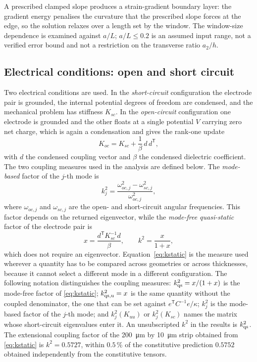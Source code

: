 A prescribed clamped slope produces a strain-gradient boundary layer: the gradient energy penalises the curvature that the
prescribed slope forces at the edge, so the solution relaxes over a length set
by the window. The window-size dependence is examined against $a/L$;
$a/L\le0.2$ is an assumed input range, not a verified error bound and
not a restriction on the transverse ratio $a_2/h$.

\FloatBarrier
\subsection{Electrical conditions: open and short circuit}
\label{sec:bc_elec}

Two electrical conditions are used. In the \emph{short-circuit} configuration
the electrode pair is grounded, the internal potential degrees of freedom are
condensed, and the mechanical problem has stiffness $K_{sc}$. In the
\emph{open-circuit} configuration one electrode is grounded and the other
floats at a single potential $V$ carrying zero net charge, which is again a
condensation and gives the rank-one update
\begin{equation}
  K_{oc} = K_{sc} + \frac{1}{\beta}\, d\,d^{\mathsf T},
  \label{eq:rankone}
\end{equation}
with $d$ the condensed coupling vector and $\beta$ the condensed dielectric
coefficient. The two coupling measures used in the analysis are defined below. The \emph{mode-based} factor of the $j$-th mode is
\begin{equation}
  k_j^2=\frac{\omega_{oc,j}^2-\omega_{sc,j}^2}{\omega_{oc,j}^2},
  \label{eq:k2mode}
\end{equation}
where $\omega_{oc,j}$ and $\omega_{sc,j}$ are the open- and short-circuit
angular frequencies. This factor depends on the returned eigenvector, while the
\emph{mode-free quasi-static} factor of the electrode pair is
\begin{equation}
  x = \frac{d^{\mathsf T}K_{sc}^{-1}d}{\beta},\qquad
  k^2 = \frac{x}{1+x},
  \label{eq:kstatic}
\end{equation}
which does not require an eigenvector. Equation~\eqref{eq:kstatic} is the
measure used wherever a quantity has to be compared across geometries or
across thicknesses, because it cannot select a different mode in a different
configuration. The following notation distinguishes the coupling measures: $k^2_{\rm qs}=x/(1+x)$ is the mode-free factor of
\eqref{eq:kstatic}; $k^2_{\rm qs,u}=x$ is the same quantity without the coupled
denominator, the one that can be set against $e^{\mathsf T}C^{-1}e/\kappa$;
$k^2_{j}$ is the mode-based factor of the $j$-th mode; and $k^2_{j}(K_{uu})$ or
$k^2_{j}(K_{sc})$ names the matrix whose short-circuit eigenvalues enter it. An
unsubscripted $k^2$ in the results is $k^2_{\rm qs}$. The extensional coupling
factor of the \SI{200}{\micro\meter} by \SI{10}{\micro\meter} strip obtained
from \eqref{eq:kstatic} is $k^2=0.5727$, within $0.5\,\%$ of the constitutive
prediction $0.5752$ obtained independently from the constitutive tensors.

